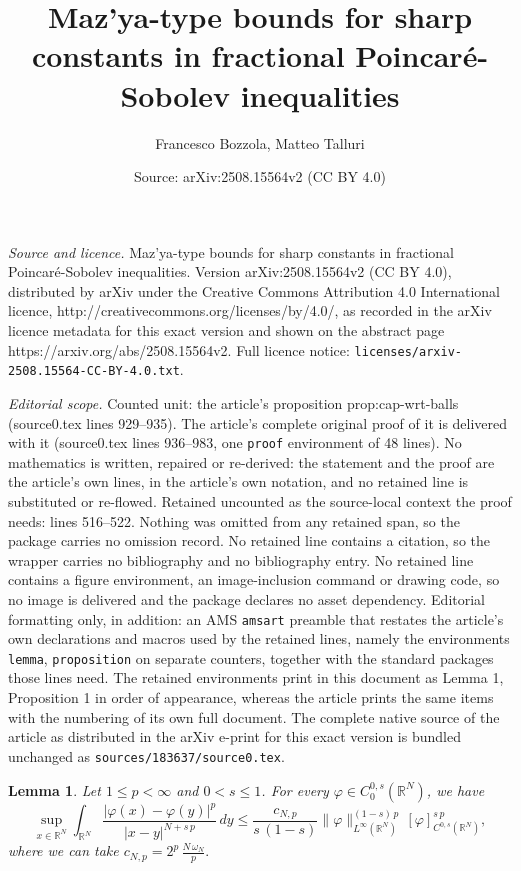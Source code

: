 \documentclass[10pt,a4paper]{amsart}
\title{Maz'ya-type bounds for sharp constants in fractional Poincar\'e-Sobolev inequalities}
\author{Francesco Bozzola, Matteo Talluri}
\date{Source: arXiv:2508.15564v2 (CC BY 4.0)}
\newtheorem{lemma}{Lemma}
\begin{document}
\maketitle

\noindent\emph{Source and licence.} Maz'ya-type bounds for sharp constants in fractional Poincar\'e-Sobolev inequalities. Version arXiv:2508.15564v2 (CC BY 4.0), distributed by arXiv under the Creative Commons Attribution 4.0 International licence, http://creativecommons.org/licenses/by/4.0/, as recorded in the arXiv licence metadata for this exact version and shown on the abstract page https://arxiv.org/abs/2508.15564v2. Full licence notice: \texttt{licenses/arxiv-2508.15564-CC-BY-4.0.txt}.\par\smallskip

\noindent\textit{Editorial scope.} Counted unit: the article's proposition prop:cap-wrt-balls (source0.tex lines 929--935). The article's complete original proof of it is delivered with it (source0.tex lines 936--983, one \texttt{proof} environment of 48 lines). No mathematics is written, repaired or re-derived: the statement and the proof are the article's own lines, in the article's own notation, and no retained line is substituted or re-flowed.  Retained uncounted as the source-local context the proof needs: lines 516--522.  Nothing was omitted from any retained span, so the package carries no omission record.  No retained line contains a citation, so the wrapper carries no bibliography and no bibliography entry.  No retained line contains a figure environment, an image-inclusion command or drawing code, so no image is delivered and the package declares no asset dependency.  Editorial formatting only, in addition: an AMS \texttt{amsart} preamble that restates the article's own declarations and macros used by the retained lines, namely the environments \texttt{lemma}, \texttt{proposition} on separate counters, together with the standard packages those lines need.  The retained environments print in this document as Lemma 1, Proposition 1 in order of appearance, whereas the article prints the same items with the numbering of its own full document.  The complete native source of the article as distributed in the arXiv e-print for this exact version is bundled unchanged as \texttt{sources/183637/source0.tex}.
	\begin{lemma} \label{leibniz-holder}
		Let $1 \le p < \infty$ and $0< s \le 1$. For every $\varphi \in C^{0,s}_0(\mathbb{R}^N)$, we have
		\[
		\sup_{x \in \mathbb{R}^N} \int_{\mathbb{R}^N} \frac{|\varphi(x) - \varphi(y)|^p}{|x-y|^{N+s\,p}}\,dy \le \frac{c_{N,p}}{s\,(1-s)} \|\varphi\|^{(1-s)\,p}_{L^\infty(\mathbb{R}^N)}\,[\varphi]^{s\,p}_{C^{0,s}(\mathbb{R}^N)}, 
		\]
		where we can take $c_{N,p} = 2^p\,\frac{N\,\omega_N}{p}.$
	\end{lemma}
\end{document}

